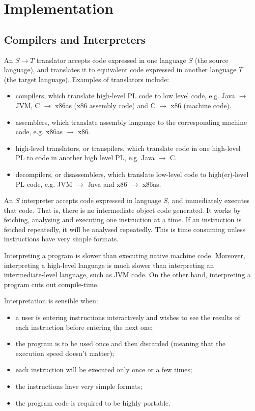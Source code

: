 \documentclass[a4paper, openany]{memoir}
\begin{document}
\chapter{Implementation}
\section{Compilers and Interpreters}
An $S \to T$ translator accepts code expressed in one language $S$ (the source language), and translates it to equivalent code expressed in another language $T$ (the target language). Examples of translators include:
\begin{itemize}
    \item compilers, which translate high-level PL code to low level code, e.g. Java $\to$ JVM, C $\to$ x86as (x86 assembly code) and C $\to$ x86 (machine code).
    \item assemblers, which translate assembly language to the corresponding machine code, e.g. x86as $\to$ x86.
    \item high-level translators, or transpilers, which translate code in one high-level PL to code in another high level PL, e.g. Java $\to$ C.
    \item decompilers, or disassemblers, which translate low-level code to high(er)-level PL code, e.g. JVM $\to$ Java and x86 $\to$ x86as.
\end{itemize}

An $S$ interpreter accepts code expressed in language $S$, and immediately executes that code. That is, there is no intermediate object code generated. It works by fetching, analysing and executing one instruction at a time. If an instruction is fetched repeatedly, it will be analysed repeatedly. This is time consuming unless instructions have very simple formats.

Interpreting a program is slower than executing native machine code. Moreover, interpreting a high-level language is much slower than interpreting an intermediate-level language, such as JVM code. On the other hand, interpreting a program cuts out compile-time.

Interpretation is sensible when:
\begin{itemize}
    \item a user is entering instructions interactively and wishes to see the results of each instruction before entering the next one;
    \item the program is to be used once and then discarded (meaning that the execution speed doesn't matter);
    \item each instruction will be executed only once or a few times;
    \item the instructions have very simple formats;
    \item the program code is required to be highly portable.
\end{itemize}
\end{document}
